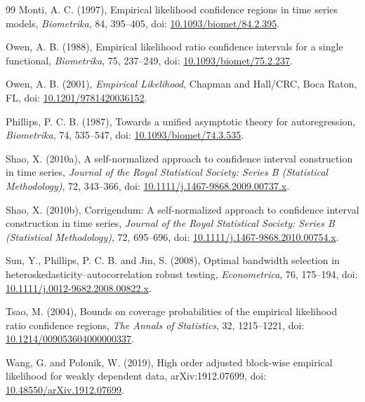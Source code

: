 \documentclass[12pt]{article}
\theoremstyle{remark}
\begin{document}
\begin{thebibliography}{99}
Monti, A. C. (1997), Empirical likelihood confidence regions in time series models, \emph{Biometrika}, 84, 395--405, doi: \href{https://doi.org/10.1093/biomet/84.2.395}{10.1093/biomet/84.2.395}.

Owen, A. B. (1988), Empirical likelihood ratio confidence intervals for a single functional, \emph{Biometrika}, 75, 237--249, doi: \href{https://doi.org/10.1093/biomet/75.2.237}{10.1093/biomet/75.2.237}.

Owen, A. B. (2001), \emph{Empirical Likelihood}, Chapman and Hall/CRC, Boca Raton, FL, doi: \href{https://doi.org/10.1201/9781420036152}{10.1201/9781420036152}.

Phillips, P. C. B. (1987), Towards a unified asymptotic theory for autoregression, \emph{Biometrika}, 74, 535--547, doi: \href{https://doi.org/10.1093/biomet/74.3.535}{10.1093/biomet/74.3.535}.

Shao, X. (2010a), A self-normalized approach to confidence interval construction in time series, \emph{Journal of the Royal Statistical Society: Series B (Statistical Methodology)}, 72, 343--366, doi: \href{https://doi.org/10.1111/j.1467-9868.2009.00737.x}{10.1111/j.1467-9868.2009.00737.x}.

Shao, X. (2010b), Corrigendum: A self-normalized approach to confidence interval construction in time series, \emph{Journal of the Royal Statistical Society: Series B (Statistical Methodology)}, 72, 695--696, doi: \href{https://doi.org/10.1111/j.1467-9868.2010.00754.x}{10.1111/j.1467-9868.2010.00754.x}.

Sun, Y., Phillips, P. C. B. and Jin, S. (2008), Optimal bandwidth selection in heteroskedasticity--autocorrelation robust testing, \emph{Econometrica}, 76, 175--194, doi: \href{https://doi.org/10.1111/j.0012-9682.2008.00822.x}{10.1111/j.0012-9682.2008.00822.x}.

Tsao, M. (2004), Bounds on coverage probabilities of the empirical likelihood ratio confidence regions, \emph{The Annals of Statistics}, 32, 1215--1221, doi: \href{https://doi.org/10.1214/009053604000000337}{10.1214/009053604000000337}.

Wang, G. and Polonik, W. (2019), High order adjusted block-wise empirical likelihood for weakly dependent data, arXiv:1912.07699, doi: \href{https://doi.org/10.48550/arXiv.1912.07699}{10.48550/arXiv.1912.07699}.


\end{thebibliography}
\end{document}
